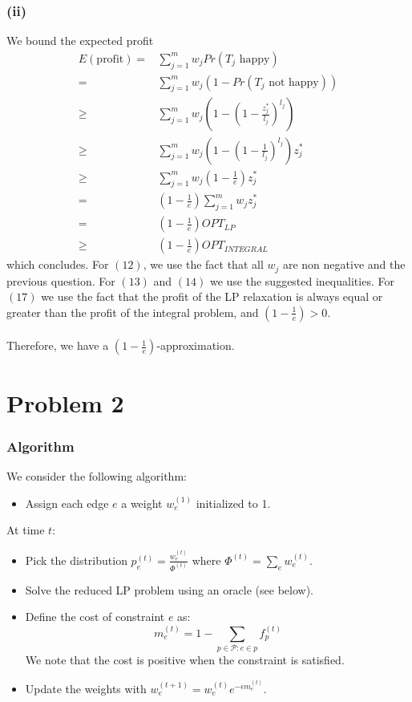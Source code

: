 \documentclass[a4paper, 11pt]{article}
\begin{document}
\subsubsection*{(ii)}
We bound the expected profit
\begin{align}
    E (\text{profit}) ={}&\sum_{j=1}^m w_j Pr(T_j\text{ happy})\\
    ={}&\sum_{j=1}^m w_j (1-Pr(T_j\text{ not happy}))\\
    \geq{}& \sum_{j=1}^m w_j \left(1-\left(1-\frac{z_j^*}{l_j}\right)^{l_j}\right)\\
    \geq{}& \sum_{j=1}^m w_j \left(1-\left(1-\frac{1}{l_j}\right)^{l_j}\right)z_j^*\\
    \geq{}& \sum_{j=1}^m w_j \left(1-\frac{1}{e}\right)z_j^*\\
    ={}& \left(1-\frac{1}{e}\right)\sum_{j=1}^m w_j z_j^*\\
    ={}& \left(1-\frac{1}{e}\right)OPT_{LP}\\
    \geq{}& \left(1-\frac{1}{e}\right)OPT_{INTEGRAL}
\end{align}
which concludes. For $(12)$, we use the fact that all $w_j$ are non negative and the previous question. For $(13)$ and $(14)$ we use the suggested inequalities. For $(17)$ we use the fact that the profit of the LP relaxation is always equal or greater than the profit of the integral problem, and $\left(1-\frac{1}{e}\right)>0$.\\\\
Therefore, we have a $\left(1-\frac{1}{e}\right)$-approximation.

\newpage

\section*{Problem 2}

\subsubsection*{Algorithm}

We consider the following algorithm:

\begin{itemize}
    \item Assign each edge $e$ a weight $w_e^{(1)}$ initialized to 1.
\end{itemize}
At time $t$: %
\begin{itemize}
    \item Pick the distribution $p_e^{(t)} = \frac{w_e^{(t)}}{\Phi^{(t)}}$ where $\Phi^{(t)} = \sum_{e} w_e^{(t)}$.
    \item Solve the reduced LP problem using an oracle (see below).
    \item Define the cost of constraint $e$ as:
        $$\boxed{m_e^{(t)} = 1 - \sum_{p\in\mathcal{P} : e \in p} f_p^{(t)}}$$
        We note that the cost is positive when the constraint is satisfied.
    \item Update the weights with $w_e^{(t+1)} = w_e^{(t)} e^{-\epsilon m_e^{(t)}}$.
\end{itemize}
\end{document}

